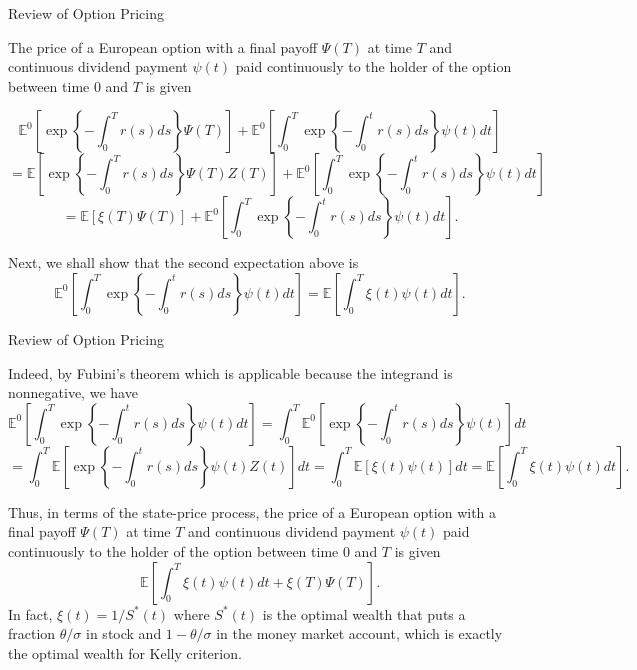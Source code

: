 \documentclass{beamer}
\begin{document}
\begin{frame}{Review of Option Pricing}

    {\footnotesize \footnotesize
     The price of a European option with a final payoff \(\Psi(T)\) at 
     time \(T\) and continuous dividend payment \(\psi(t)\) paid continuously 
     to the holder of the option between time 0 and \(T\) is given
      {\footnotesize \tiny
\[
\mathbb{E}^0 \left[ \exp \left\{ - \int_0^T r(s) ds \right\} \Psi(T) \right] + \mathbb{E}^0 \left[ \int_0^T \exp \left\{ - \int_0^t r(s) ds \right\} \psi(t) dt \right]
\]
\[
= \mathbb{E} \left[ \exp \left\{ - \int_0^T r(s) ds \right\} \Psi(T) Z(T) \right] + \mathbb{E}^0 \left[ \int_0^T \exp \left\{ - \int_0^t r(s) ds \right\} \psi(t) dt \right]
\]
\[
= \mathbb{E}[\xi(T)\Psi(T)] + \mathbb{E}^0 \left[ \int_0^T \exp \left\{ - \int_0^t r(s) ds \right\} \psi(t) dt \right].
\]

    }

 \pause Next, we shall show that the second expectation above is
 {\footnotesize \tiny
\[
\mathbb{E}^0 \left[ \int_0^T \exp \left\{ - \int_0^t r(s) ds \right\} \psi(t) dt \right] = \mathbb{E} \left[ \int_0^T \xi(t) \psi(t) dt \right].
\]
    }

 

    }
\end{frame}


\begin{frame}{Review of Option Pricing}

    {\footnotesize \footnotesize
      Indeed, by Fubini's theorem which is applicable because the integrand is nonnegative, we have
       {\footnotesize \tiny
\[
\mathbb{E}^0 \left[ \int_0^T \exp \left\{ - \int_0^t r(s) ds \right\} \psi(t) dt \right]
= \int_0^T \mathbb{E}^0 \left[ \exp \left\{ - \int_0^t r(s) ds \right\} \psi(t) \right] dt
\]
\[
= \int_0^T \mathbb{E} \left[ \exp \left\{ - \int_0^t r(s) ds \right\} \psi(t) Z(t) \right] dt
= \int_0^T \mathbb{E} [\xi(t)\psi(t)] dt
= \mathbb{E} \left[ \int_0^T \xi(t)\psi(t) dt \right].
\]
    }


 \pause Thus, in terms of the state-price process, the price of a European option with a final payoff \(\Psi(T)\) at time \(T\) and 
continuous dividend payment \(\psi(t)\) paid continuously to the holder of the option between time 0 and \(T\) is given
\[
\mathbb{E} \left[ \int_0^T \xi(t)\psi(t) dt + \xi(T) \Psi(T) \right].
\]
 \pause In fact, \(\xi(t) = 1 / S^*(t)\) where \(S^*(t)\) is the optimal wealth that puts a fraction \(\theta / \sigma\) in 
stock and \(1 - \theta / \sigma\) in the money market account, which is exactly the optimal wealth for Kelly criterion.
    }
\end{frame}
\end{document}

